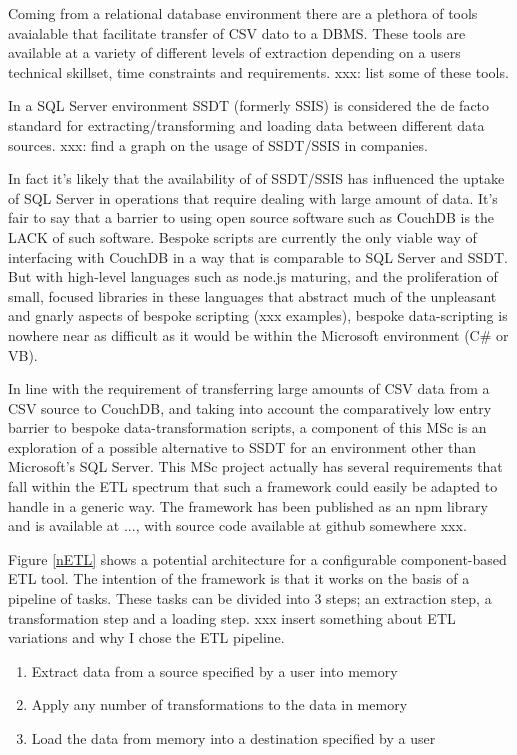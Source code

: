 Coming from a relational database environment there are a plethora of tools avaialable that facilitate transfer of CSV dato to a DBMS. These tools are available at a variety of different levels of extraction depending on a users technical skillset, time constraints and requirements. xxx: list some of these tools.

In a SQL Server environment SSDT (formerly SSIS) is considered the de facto standard for extracting/transforming and loading data between different data sources. xxx: find a graph on the usage of SSDT/SSIS in companies.

In fact it's likely that the availability of of SSDT/SSIS has influenced the uptake of SQL Server in operations that require dealing with large amount of data. It's fair to say that a barrier to using open source software such as CouchDB is the LACK of such software. Bespoke scripts are currently the only viable way of interfacing with CouchDB in a way that is comparable to SQL Server and SSDT. But with high-level languages such as node.js maturing, and the proliferation of small, focused libraries in these languages that abstract much of the unpleasant and gnarly aspects of bespoke scripting (xxx examples), bespoke data-scripting is nowhere near as difficult as it would be within the Microsoft environment (C\# or VB).

In line with the requirement of transferring large amounts of CSV data from a CSV source to CouchDB, and taking into account the comparatively low entry barrier to bespoke data-transformation scripts, a component of this MSc is an exploration of a possible alternative to SSDT for an environment other than Microsoft's SQL Server. This MSc project actually has several requirements that fall within the ETL spectrum that such a framework could easily be adapted to handle in a generic way. The framework has been published as an npm library and is available at ..., with source code available at github somewhere xxx.

Figure \ref{nETL} shows a potential architecture for a configurable component-based ETL tool. The intention of the framework is that it works on the basis of a pipeline of tasks. These tasks can be divided into 3 steps; an extraction step, a transformation step and a loading step. xxx insert something about ETL variations and why I chose the ETL pipeline.

\begin{enumerate}
    \item Extract data from a source specified by a user into memory
    \item Apply any number of transformations to the data in memory
    \item Load the data from memory into a destination specified by a user
\end{enumerate}

